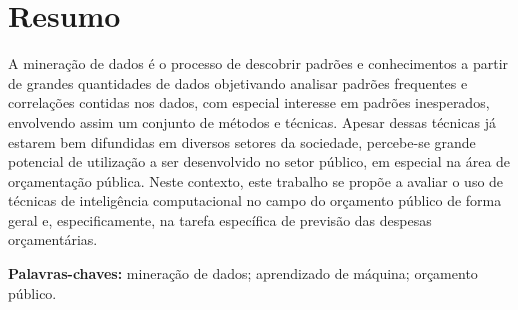\underline{}%
\chapter*{Resumo}\label{resumo}


A mineração de dados é o processo de descobrir padrões e conhecimentos a partir de grandes quantidades de dados objetivando analisar padrões frequentes e correlações contidas nos dados, com especial interesse em padrões inesperados, envolvendo assim um conjunto de métodos e técnicas. Apesar dessas técnicas já estarem bem difundidas em diversos setores da sociedade, percebe-se grande potencial de utilização a ser desenvolvido no setor público, em especial na área de orçamentação pública.  
Neste contexto, este trabalho se propõe a avaliar o uso de técnicas de inteligência computacional no campo do orçamento público de forma geral e, especificamente, na tarefa específica de previsão das despesas orçamentárias.

\textbf{Palavras-chaves:} mineração de dados; aprendizado de máquina; orçamento público.






\par
